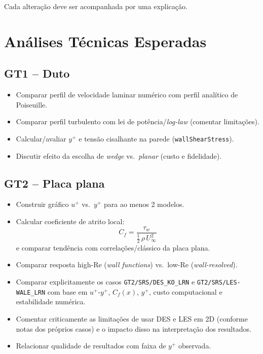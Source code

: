 \documentclass[12pt,a4paper]{article}
\begin{document}
Cada alteração deve ser acompanhada por uma explicação.

\section{Análises Técnicas Esperadas}

\subsection{GT1 -- Duto}

\begin{itemize}
  \item Comparar perfil de velocidade laminar numérico com perfil analítico de Poiseuille.
  \item Comparar perfil turbulento com lei de potência/\textit{log-law} (comentar limitações).
  \item Calcular/avaliar $y^+$ e tensão cisalhante na parede (\texttt{wallShearStress}).
  \item Discutir efeito da escolha de \textit{wedge} vs.\ \textit{planar} (custo e fidelidade).
\end{itemize}

\subsection{GT2 -- Placa plana}

\begin{itemize}
  \item Construir gráfico $u^+$ vs.\ $y^+$ para ao menos 2 modelos.
  \item Calcular coeficiente de atrito local:
  \begin{equation}
    C_f = \frac{\tau_w}{\tfrac{1}{2}\,\rho\,U_\infty^2}
  \end{equation}
  e comparar tendência com correlações/clássico da placa plana.
  \item Comparar resposta high-Re (\textit{wall functions}) vs.\ low-Re (\textit{wall-resolved}).
  \item Comparar explicitamente os casos \texttt{GT2/SRS/DES\_KO\_LRN} e \texttt{GT2/SRS/LES-WALE\_LRN} com base em $u^+$-$y^+$, $C_f(x)$, $y^+$, custo computacional e estabilidade numérica.
  \item Comentar criticamente as limitações de usar DES e LES em 2D (conforme notas dos próprios casos) e o impacto disso na interpretação dos resultados.
  \item Relacionar qualidade de resultados com faixa de $y^+$ observada.
\end{itemize}
\end{document}
